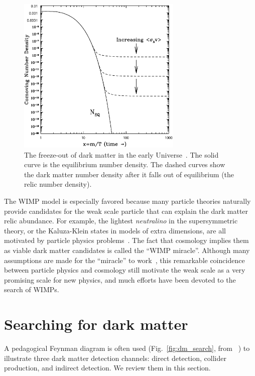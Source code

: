 \documentclass[doublespace,nopageskip]{VTthesis} %
\begin{document}
\begin{figure}[htb]
    \centering
    \includegraphics[width=0.7\textwidth]{Figures/Intro/freezeout.ps}
    \caption{The freeze-out of dark matter in the early Universe~\cite{2009arXiv0901.4090H}. The solid curve is the equilibrium number density. The dashed curves show the dark matter number density after it falls out of equilibrium (the relic number density).}
    \label{fig:freeze-out}
\end{figure}

The WIMP model is especially favored because many particle theories naturally provide candidates for the weak scale particle that can explain the dark matter relic abundance. For example, the lightest \textit{neutralino} in the supersymmetric theory, or the Kaluza-Klein states in models of extra dimensions, are all motivated by particle physics problems~\cite{2005PhR...405..279B}. The fact that cosmology implies them as viable dark matter candidates is called the ``WIMP miracle''. Although many assumptions are made for the ``miracle'' to work~\cite{2019arXiv190407915L}, this remarkable coincidence between particle physics and cosmology still motivate the weak scale as a very promising scale for new physics, and much efforts have been devoted to the search of WIMPs.

\section{Searching for dark matter}

A pedagogical Feynman diagram is often used (Fig.~\ref{fig:dm_search}, from ~\citet{2019FrP.....7...75G}) to illustrate three dark matter detection channels: direct detection, collider production, and indirect detection. We review them in this section.
\end{document}

